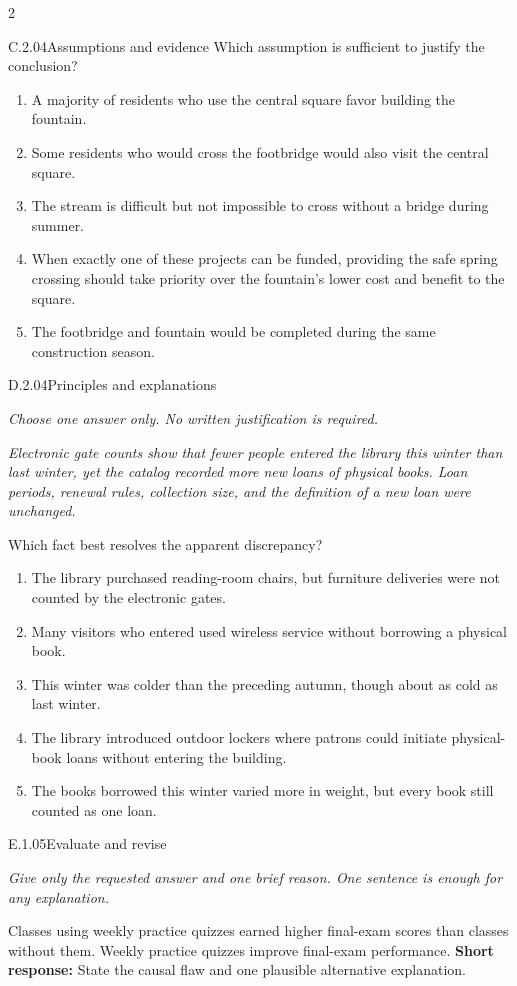 \documentclass[9pt]{extarticle}
\newcommand{\choice}[1]{\item #1}
\begin{document}
\begin{multicols}{2}
\begin{DenseCoreProblem}{C.2.04}{Assumptions and evidence}
Which assumption is sufficient to justify the conclusion?
\begin{enumerate}[label=(\alph*)]
  \choice{A majority of residents who use the central square favor building the fountain.}
  \choice{Some residents who would cross the footbridge would also visit the central square.}
  \choice{The stream is difficult but not impossible to cross without a bridge during summer.}
  \choice{When exactly one of these projects can be funded, providing the safe spring crossing should take priority over the fountain's lower cost and benefit to the square.}
  \choice{The footbridge and fountain would be completed during the same construction season.}
\end{enumerate}
\end{DenseCoreProblem}
\begin{DenseCoreProblem}{D.2.04}{Principles and explanations}
{\scriptsize\textit{Choose one answer only. No written justification is required.}\par}
\emph{Electronic gate counts show that fewer people entered the library this winter than last winter, yet the catalog recorded more new loans of physical books. Loan periods, renewal rules, collection size, and the definition of a new loan were unchanged.}

Which fact best resolves the apparent discrepancy?
\begin{enumerate}[label=(\alph*)]
  \choice{The library purchased reading-room chairs, but furniture deliveries were not counted by the electronic gates.}
  \choice{Many visitors who entered used wireless service without borrowing a physical book.}
  \choice{This winter was colder than the preceding autumn, though about as cold as last winter.}
  \choice{The library introduced outdoor lockers where patrons could initiate physical-book loans without entering the building.}
  \choice{The books borrowed this winter varied more in weight, but every book still counted as one loan.}
\end{enumerate}
\end{DenseCoreProblem}
\begin{DenseCoreProblem}{E.1.05}{Evaluate and revise}
{\scriptsize\textit{Give only the requested answer and one brief reason. One sentence is enough for any explanation.}\par}
Classes using weekly practice quizzes earned higher final-exam scores than classes without them. Weekly practice quizzes improve final-exam performance.
\textbf{Short response:} State the causal flaw and one plausible alternative explanation.
\end{DenseCoreProblem}
\end{multicols}
\end{document}
